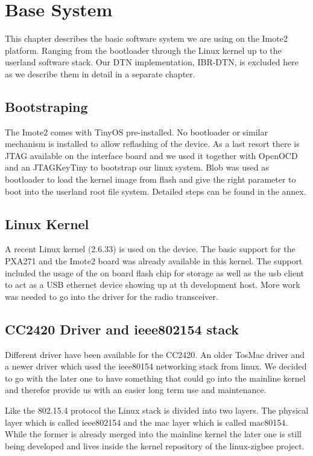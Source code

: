 \chapter{Base System}
This chapter describes the basic software system we are using on the Imote2
platform. Ranging from the bootloader through the Linux kernel up to the
userland software stack. Our DTN implementation, IBR-DTN, is excluded here as we
describe them in detail in a separate chapter.

\section{Bootstraping}
The Imote2 comes with TinyOS pre-installed. No bootloader or similar mechanism
is installed to allow reflashing of the device. As a last resort there is JTAG
available on the interface board and we used it together with OpenOCD and an
JTAGKeyTiny to bootstrap our linux system. Blob was used as bootloader to load
the kernel image from flash and give the right parameter to boot into the
userland root file system. Detailed steps can be found in the annex.

\section{Linux Kernel}
A recent Linux kernel (2.6.33) is used on the device. The basic support for the
PXA271 and the Imote2 board was already available in this kernel. The support
included the usage of the on board flash chip for storage as well as the usb
client to act as a USB ethernet device showing up at th development host. More
work was needed to go into the driver for the radio transceiver.

\section{CC2420 Driver and ieee802154 stack}
Different driver have been available for the CC2420. An older TosMac driver and
a newer driver which used the ieee80154 networking stack from linux. We decided
to go with the later one to have something that could go into the mainline
kernel and therefor provide us with an easier long term use and maintenance.

Like the 802.15.4 protocol the Linux stack is divided into two layers. The
physical layer which is called ieee802154 and the mac layer which is called
mac80154. While the former is already merged into the mainline kernel the later
one is still being developed and lives inside the kernel repository of the
linux-zigbee project.

